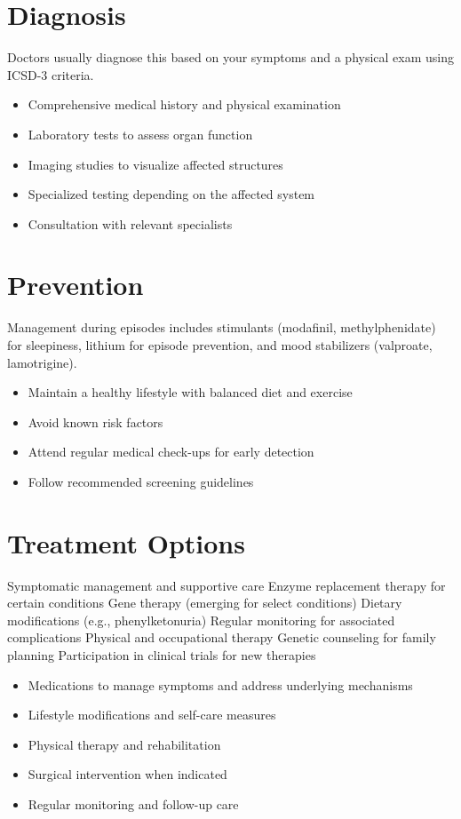 \section{Diagnosis}
Doctors usually diagnose this based on your symptoms and a physical exam using ICSD-3 criteria.

\begin{itemize}[noitemsep]
  \item Comprehensive medical history and physical examination
  \item Laboratory tests to assess organ function
  \item Imaging studies to visualize affected structures
  \item Specialized testing depending on the affected system
  \item Consultation with relevant specialists
\end{itemize}
\section{Prevention}
Management during episodes includes stimulants (modafinil, methylphenidate) for sleepiness, lithium for episode prevention, and mood stabilizers (valproate, lamotrigine).

\begin{itemize}[noitemsep]
  \item Maintain a healthy lifestyle with balanced diet and exercise
  \item Avoid known risk factors
  \item Attend regular medical check-ups for early detection
  \item Follow recommended screening guidelines
\end{itemize}
\section{Treatment Options}
Symptomatic management and supportive care Enzyme replacement therapy for certain conditions Gene therapy (emerging for select conditions) Dietary modifications (e.g., phenylketonuria) Regular monitoring for associated complications Physical and occupational therapy Genetic counseling for family planning Participation in clinical trials for new therapies

\begin{itemize}[noitemsep]
  \item Medications to manage symptoms and address underlying mechanisms
  \item Lifestyle modifications and self-care measures
  \item Physical therapy and rehabilitation
  \item Surgical intervention when indicated
  \item Regular monitoring and follow-up care
\end{itemize}

